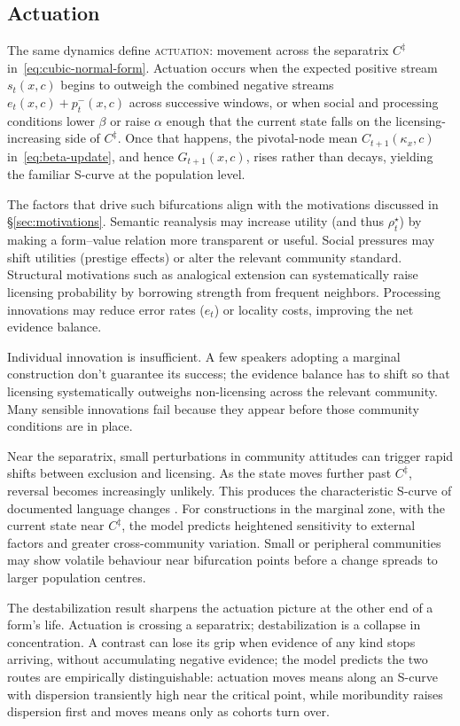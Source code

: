 \documentclass[12pt,letterpaper]{article}
\newcommand{\term}[1]{\textsc{#1}}
\begin{document}
\subsection{Actuation}
\label{sec:actuation}

The same dynamics define \term{actuation}: movement across the separatrix
$C^\ddagger$ in~\eqref{eq:cubic-normal-form}. Actuation occurs when the expected
positive stream $s_t(x,c)$ begins to outweigh the combined negative streams
$e_t(x,c)+p_t^-(x,c)$ across successive windows, or when social and processing
conditions lower $\beta$ or raise $\alpha$ enough that the current state falls on
the licensing-increasing side of $C^\ddagger$. Once that happens, the
pivotal-node mean $C_{t+1}(\kappa_x,c)$ in~\eqref{eq:beta-update}, and hence
$G_{t+1}(x,c)$, rises rather than decays, yielding the familiar S-curve at the
population level.

The factors that drive such bifurcations align with the motivations discussed
in \S\ref{sec:motivations}. Semantic reanalysis may increase utility (and thus
$\rho_t^\star$) by making a form--value relation more transparent or useful.
Social pressures may shift utilities (prestige effects) or alter the relevant
community standard. Structural motivations such as analogical extension can
systematically raise licensing probability by borrowing strength from frequent
neighbors. Processing innovations may reduce error rates ($e_t$) or locality
costs, improving the net evidence balance.

Individual innovation is insufficient. A few speakers adopting a marginal
construction don't guarantee its success; the evidence balance has to shift so
that licensing systematically outweighs non-licensing across the relevant
community. Many sensible innovations fail because they appear before those
community conditions are in place.

Near the separatrix, small perturbations in community attitudes can trigger
rapid shifts between exclusion and licensing. As the state moves further past
$C^\ddagger$, reversal becomes increasingly unlikely. This produces the
characteristic S-curve of documented language changes \autocite{kroch1989}. For
constructions in the marginal zone, with the current state near $C^\ddagger$, the
model predicts
heightened sensitivity to external factors and greater cross-community
variation. Small or peripheral communities may show volatile behaviour near
bifurcation points before a change spreads to larger population centres.

The destabilization result sharpens the actuation picture at the other end of a
form's life. Actuation is crossing a separatrix; destabilization is a collapse
in concentration. A contrast can lose its grip when evidence of any kind stops
arriving, without accumulating negative evidence; the model predicts the two
routes are empirically
distinguishable: actuation moves means along an S-curve with dispersion
transiently high near the critical point, while moribundity raises dispersion
first and moves means only as cohorts turn over.
\end{document}
